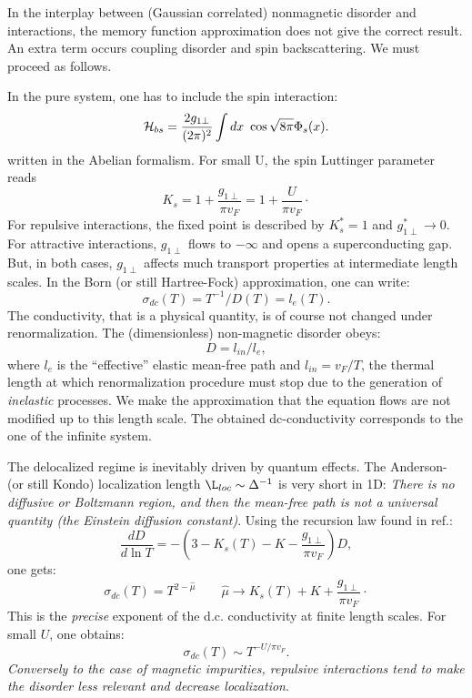 In the interplay between (Gaussian correlated)
nonmagnetic disorder and
interactions, the memory function approximation
does not give the correct result. An extra term occurs coupling disorder
and spin backscattering. We must proceed as follows.

In the pure system, one has to include the spin interaction:
\begin{equation}
{\cal H}_{bs}=\frac{2g_{1\perp}}{(2\pi)^2}\int dx\ 
\cos\sqrt{8\pi}\Phi_s(x).
\end{equation}
written in the Abelian formalism\cite{Helene}. For
small U, the spin Luttinger parameter reads
\begin{equation}
K_s=1+\frac{g_{1\perp}}{\pi v_F}=1+\frac{U}{\pi v_F}\cdot
\end{equation}
For repulsive interactions, the fixed point is described by $K_s^*=1$
and $g_{1\perp}^*\rightarrow 0$. For attractive interactions, $g_{1\perp}$
flows to $-\infty$ and opens a superconducting gap. But, in both
cases, $g_{1\perp}$ affects much transport properties at intermediate length
scales. In the Born (or still Hartree-Fock) 
approximation, one can write\cite{Helene}:
\begin{equation}
\sigma_{dc}(T)=T^{-1}/D(T)=l_e(T).
\end{equation}
The conductivity, that is a physical quantity, is of course not changed 
under renormalization.
The (dimensionless) non-magnetic disorder obeys:
\begin{equation}
D=l_{in}/l_e,
\end{equation}
where $l_e$ is the ``effective'' 
elastic mean-free path and $l_{in}=v_F/T$, the
thermal length at which renormalization procedure must stop due to
the generation of {\it inelastic} processes. 
We make the approximation that the
equation flows are not modified up to this length scale. The obtained
dc-conductivity corresponds to the one of the infinite system.

The delocalized regime 
is inevitably driven by
quantum effects. The Anderson- (or still Kondo)
localization length $\L_{loc}\sim \Delta^{-1}$ 
is very short in 1D: {\it There is no diffusive or
Boltzmann region, and then
the mean-free path is not a universal quantity 
(the Einstein diffusion constant)}. 
\vskip 0.2cm
Using the recursion law found in ref.\cite{Giam2}:
\begin{equation}
\frac{dD}{d\ln T}=-(3-K_s(T)-K-\frac{g_{1\perp}}{\pi v_F})D,
\end{equation}
one gets:
\begin{equation}
\sigma_{dc}(T)=T^{2-\hat{\mu}}\qquad \hat{\mu}\rightarrow 
K_s(T)+K+\frac{g_{1\perp}}{\pi v_F}\cdot
\end{equation}
This is the {\it precise} exponent of the d.c. conductivity at finite
length scales. For small $U$, one obtains:
\begin{equation}
\sigma_{dc}(T)\sim T^{-U/\pi v_F}.
\end{equation}
{\it Conversely to the case of magnetic impurities, 
repulsive interactions tend to make the disorder less relevant
and decrease localization}.

